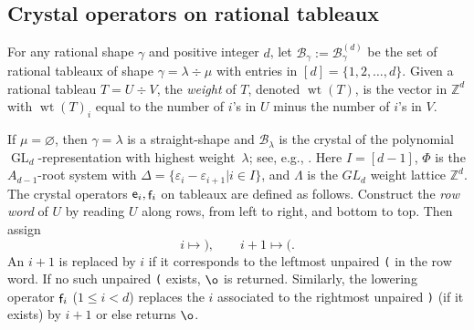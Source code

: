 \documentclass[12pt]{amsart}
\DeclareMathOperator{\tabe}{{\sf e}}
\DeclareMathOperator{\tabf}{{\sf f}}
\theoremstyle{definition}
\theoremstyle{remark}
\begin{document}
\subsection{Crystal operators on rational tableaux} \label{sec:crystal-ops-rational-tableaux}

For any rational shape $\gamma$ and positive integer $d$, let $\mathcal{B}_\gamma := \mathcal{B}^{(d)}_\gamma$ be the set of rational tableaux of shape $\gamma = \lambda\div \mu$ with entries in $[d]=\{1,2,\ldots,d\}$. Given 
a rational tableau $T=U\div V$, the \emph{weight} of $T$,
denoted $\operatorname{wt}(T)$, is the vector in ${\mathbb Z}^d$ with $\operatorname{wt}(T)_i$ equal to
the number of $i$'s in $U$ minus the number of $i$'s in $V$.

If $\mu=\varnothing$, then $\gamma = \lambda$ is a straight-shape and ${\mathcal B}_{\lambda}$
is the crystal of the polynomial  $\operatorname{GL}_d$-representation with highest weight~$\lambda$; see, e.g., \cite[Chapters~2,3]{Bump.Schilling}. Here $I=[d-1]$, $\Phi$ is the $A_{d-1}$-root system with $\Delta=\{\varepsilon_i-\varepsilon_{i+1} | i\in I\}$, and $\Lambda$ is the $GL_d$ weight lattice ${\mathbb Z}^d$. 
The crystal operators $\tabe_i,\tabf_i$ on tableaux are defined as follows.
Construct the \emph{row word} of $U$ by reading $U$ along rows, from left to right, and bottom to top. Then assign
\[i \mapsto \texttt{)}, \qquad
i+1 \mapsto \texttt{(}.\]
An $i+1$ is replaced
by $i$ if it corresponds to the leftmost unpaired {\tt (} in the row word. If no such unpaired {\tt (} exists, $\o$ is returned. Similarly, the lowering operator $\tabf_i$ ($1\leq i < d$) replaces the $i$ associated to the rightmost unpaired {\tt )} (if it exists) by $i+1$
 or else returns $\o$. 
\end{document}

